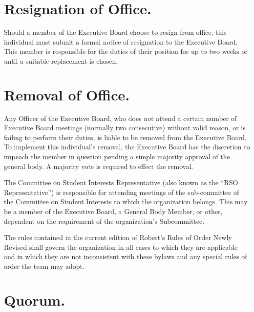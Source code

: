\documentclass[12pt]{constitution}
\begin{document}
\section{Resignation of Office.}\label{sec:RESIGNATION-OF-OFFICE}

Should a member of the Executive Board choose to resign from office, this
individual must submit a formal notice of resignation to the Executive Board.
This member is responsible for the duties of their position for up to two weeks
or until a suitable replacement is chosen.

\section{Removal of Office.}\label{sec:REMOVAL-OF-OFFICE}

Any Officer of the Executive Board, who does not attend a certain number
of Executive Board meetings (normally two consecutive) without valid reason, or
is failing to perform their duties, is liable to be removed from the Executive
Board. To implement this individual's removal, the Executive Board has the
discretion to impeach the member in question pending a simple majority approval
of the general body. A majority vote is required to effect the removal.

\label{art:COMMITTEE-ON-STUDENT-INTERESTS-REPRESENTATIVE}

The Committee on Student Interests Representative (also known as the ``RSO
Representative'') is responsible for attending meetings of the sub-committee of
the Committee on Student Interests to which the organization belongs. This may
be a member of the Executive Board, a General Body Member, or other, dependent
on the requirement of the organization’s Subcommittee.

\label{art:PARLIAMENTARY-AUTHORITY}

The rules contained in the current edition of Robert's Rules of Order Newly
Revised shall govern the organization in all cases to which they are applicable
and in which they are not inconsistent with these bylaws and any special rules
of order the team may adopt.

\label{art:MEETINGS}

\section{Quorum.}\label{sec:QUORUM}
\end{document}
